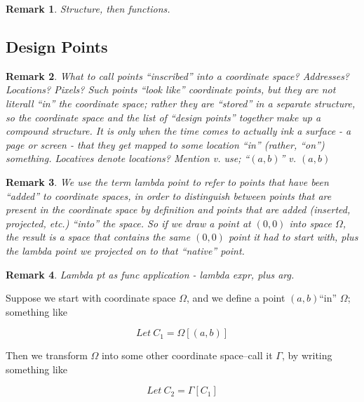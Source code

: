\documentclass[12pt]{tufte-handout}
\numberwithin{equation}{subsection}
\numberwithin{equation}{subsection}
\newtheorem{remark}{Remark}
\newcommand\cspace{coordinate space}
\newcommand\Omg{\(\Omega\)}
\newcommand\origin{\((0,0)\)}
\newcommand\ab{\((a,b)\)}
\begin{document}
{  \begin{remark}
    Structure, then functions.
  \end{remark}

  \subsection{Design Points}
  \label{sect:dpts}

  \begin{remark}
    What to call points ``inscribed'' into a \cspace{}?  Addresses?
    Locations?  Pixels?  Such points ``look like'' coordinate points,
    but they are not literall ``in'' the \cspace{}; rather they are
    ``stored'' in a separate structure, so the \cspace{} and the list
    of ``design points'' together make up a compound structure.  It is
    only when the time comes to actually ink a surface - a page or
    screen - that they get mapped to some location ``in'' (rather,
    ``on'') something.  Locatives denote locations?  Mention v. use;
    ``\((a,b)\)'' v. \((a,b)\)
  \end{remark}

  \begin{remark}
    We use the term \textit{lambda point} to refer to points that have
    been ``added'' to \cspace{}s, in order to distinguish between points
    that are present in the \cspace{} by definition and points that are
    added (inserted, projected, etc.) ``into'' the space.  So if we draw
    a point at \origin{} into space \Omg{}, the result is a space that
    contains the same \origin{} point it had to start with, plus the
    lambda point we projected on to that ``native'' point.
  \end{remark}

  \begin{remark}
    Lambda pt as func application - lambda expr, plus arg.
  \end{remark}

  Suppose we start with \cspace{} \Omg{}, and we define a point \ab ``in''
  \Omg{}; something like

  \begin{equation}
    \label{eq:omgapplic}
    Let\ C_1 = \Omega[(a,b)]
  \end{equation}

  Then we transform \Omg{} into some other \cspace{}--call it \(\Gamma\),
  by writing something like

  \begin{equation}
    \label{eq:gammapplic}
    Let\ C_2 = \Gamma[C_1]
  \end{equation}

}
\end{document}
